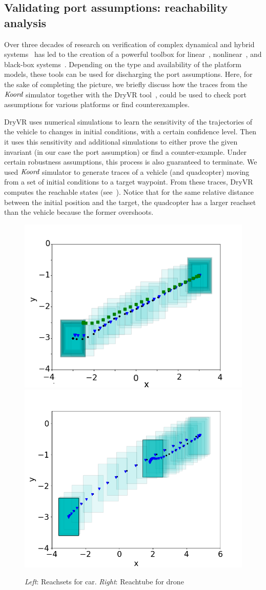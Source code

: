 \subsection{Validating port assumptions: reachability analysis}
\label{sec:port-assumptions}
 Over  three decades of research on verification of complex dynamical and hybrid systems~\cite{Alur:2015:PCS,Platzer:2018} has led to the creation of a powerful toolbox for linear~\cite{bak2017hylaa,Spaceex}, nonlinear~\cite{CAS13,DMVemsoft2013,FanQM0D16:CAV}, and black-box systems~\cite{DryVR2017}. Depending on the type and availability of the platform models, these tools can be used for discharging the port assumptions. Here, for the sake of completing the picture, we briefly discuss how the traces from the $\emph{Koord}$ simulator together with the DryVR tool~\cite{DryVR2017},  could be used to check port assumptions for various platforms or find counterexamples. 
 
 DryVR uses numerical simulations to learn the sensitivity of the trajectories of the vehicle to changes in initial conditions, with a certain confidence level. Then it uses this sensitivity and additional simulations to either prove the given invariant (in our case the port assumption) or find a counter-example. Under certain robustness assumptions, this process is also guaranteed to terminate. We used $\emph{Koord}$ simulator to generate traces of a vehicle (and quadcopter) moving from a set of initial conditions to a target waypoint. From these traces, DryVR computes the reachable states (see~). Notice that for the same relative distance between the initial position and the target, the quadcopter has a larger reachset than the vehicle because the former overshoots. 
\begin{figure}[!h]
    \includegraphics[width=0.4\linewidth]{figs/car_trajs.png}
    \includegraphics[width=0.4\linewidth]{figs/drone_trajs.png}
    \caption{\emph{Left}: Reachsets  for car. \emph{Right}: Reachtube for drone}
    \label{fig:dryVR}
\end{figure}